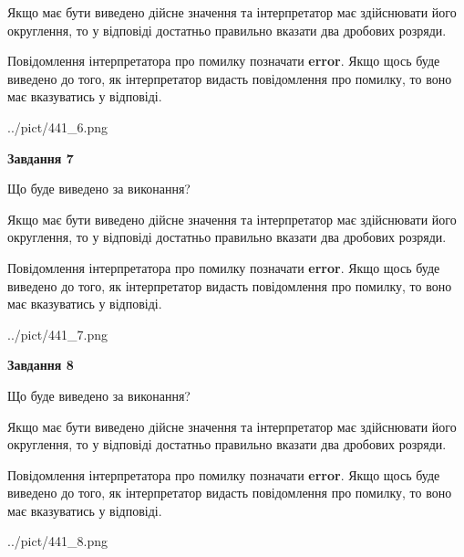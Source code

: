 \documentclass[12pt, ukrainian]{article}
\begin{document}
{\begin {Large}
Якщо має бути виведено дійсне значення та інтерпретатор має здійснювати його округлення, 
то у відповіді достатньо правильно вказати два дробових розряди.

Повідомлення інтерпретатора про помилку позначати \textbf{error}.
Якщо щось буде виведено до того, як інтерпретатор видасть повідомлення про помилку, 
то воно має вказуватись у відповіді. \par

\begin{center}
	{../pict/441_6.png}
\end{center}
\newpage

{\begin {center}\textbf{Завдання 7}\end {center}}\par
Що буде виведено за виконання? \par

Якщо має бути виведено дійсне значення та інтерпретатор має здійснювати його округлення, 
то у відповіді достатньо правильно вказати два дробових розряди.

Повідомлення інтерпретатора про помилку позначати \textbf{error}.
Якщо щось буде виведено до того, як інтерпретатор видасть повідомлення про помилку, 
то воно має вказуватись у відповіді. \par

\begin{center}
	{../pict/441_7.png}
\end{center}
\newpage

{\begin {center}\textbf{Завдання 8}\end {center}}\par
Що буде виведено за виконання? \par

Якщо має бути виведено дійсне значення та інтерпретатор має здійснювати його округлення, 
то у відповіді достатньо правильно вказати два дробових розряди.

Повідомлення інтерпретатора про помилку позначати \textbf{error}.
Якщо щось буде виведено до того, як інтерпретатор видасть повідомлення про помилку, 
то воно має вказуватись у відповіді. \par

\begin{center}
	{../pict/441_8.png}
\end{center}
\newpage


\end{Large}}
\end{document}
